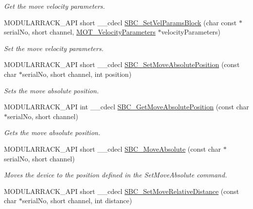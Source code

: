 \begin{DoxyCompactItemize}
\begin{DoxyCompactList}\small\item\em Get the move velocity parameters. \end{DoxyCompactList}\item 
M\+O\+D\+U\+L\+A\+R\+R\+A\+C\+K\+\_\+\+A\+PI short \+\_\+\+\_\+cdecl \hyperlink{group___modular_stepper_gaa6ee881e49ec7bf56d143fc49c03d158}{S\+B\+C\+\_\+\+Set\+Vel\+Params\+Block} (char const $\ast$serial\+No, short channel, \hyperlink{struct_m_o_t___velocity_parameters}{M\+O\+T\+\_\+\+Velocity\+Parameters} $\ast$velocity\+Parameters)
\begin{DoxyCompactList}\small\item\em Set the move velocity parameters. \end{DoxyCompactList}\item 
M\+O\+D\+U\+L\+A\+R\+R\+A\+C\+K\+\_\+\+A\+PI short \+\_\+\+\_\+cdecl \hyperlink{group___modular_stepper_ga61f9a41ebb366cd9cbe3e0d780fb140b}{S\+B\+C\+\_\+\+Set\+Move\+Absolute\+Position} (const char $\ast$serial\+No, short channel, int position)
\begin{DoxyCompactList}\small\item\em Sets the move absolute position. \end{DoxyCompactList}\item 
M\+O\+D\+U\+L\+A\+R\+R\+A\+C\+K\+\_\+\+A\+PI int \+\_\+\+\_\+cdecl \hyperlink{group___modular_stepper_ga0eb632979cb32266d701cd0e40de99d4}{S\+B\+C\+\_\+\+Get\+Move\+Absolute\+Position} (const char $\ast$serial\+No, short channel)
\begin{DoxyCompactList}\small\item\em Gets the move absolute position. \end{DoxyCompactList}\item 
M\+O\+D\+U\+L\+A\+R\+R\+A\+C\+K\+\_\+\+A\+PI short \+\_\+\+\_\+cdecl \hyperlink{group___modular_stepper_ga64760d9b5872fbf615dfc8f6424d81e6}{S\+B\+C\+\_\+\+Move\+Absolute} (const char $\ast$serial\+No, short channel)
\begin{DoxyCompactList}\small\item\em Moves the device to the position defined in the Set\+Move\+Absolute command. \end{DoxyCompactList}\item 
M\+O\+D\+U\+L\+A\+R\+R\+A\+C\+K\+\_\+\+A\+PI short \+\_\+\+\_\+cdecl \hyperlink{group___modular_stepper_ga9fa845616931814784df1f6425f71fbe}{S\+B\+C\+\_\+\+Set\+Move\+Relative\+Distance} (const char $\ast$serial\+No, short channel, int distance)

\end{DoxyCompactItemize}
